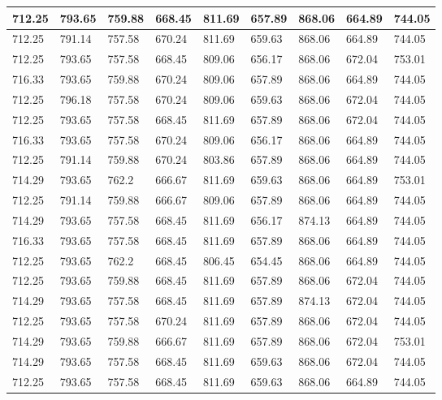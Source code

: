 \begin{longtable}{|l|l|l|l|l|l|l|l|l|}
		712.25   & 793.65  & 759.88  & 668.45  & 811.69 & 657.89  & 868.06   & 664.89  & 744.05  \\ \hline
		712.25   & 791.14  & 757.58  & 670.24  & 811.69 & 659.63  & 868.06   & 664.89  & 744.05  \\ \hline
		712.25   & 793.65  & 757.58  & 668.45  & 809.06 & 656.17  & 868.06   & 672.04  & 753.01  \\ \hline
		716.33   & 793.65  & 759.88  & 670.24  & 809.06 & 657.89  & 868.06   & 664.89  & 744.05  \\ \hline
		712.25   & 796.18  & 757.58  & 670.24  & 809.06 & 659.63  & 868.06   & 672.04  & 744.05  \\ \hline
		712.25   & 793.65  & 757.58  & 668.45  & 811.69 & 657.89  & 868.06   & 672.04  & 744.05  \\ \hline
		716.33   & 793.65  & 757.58  & 670.24  & 809.06 & 656.17  & 868.06   & 664.89  & 744.05  \\ \hline
		712.25   & 791.14  & 759.88  & 670.24  & 803.86 & 657.89  & 868.06   & 664.89  & 744.05  \\ \hline
		714.29   & 793.65  & 762.2   & 666.67  & 811.69 & 659.63  & 868.06   & 664.89  & 753.01  \\ \hline
		712.25   & 791.14  & 759.88  & 666.67  & 809.06 & 657.89  & 868.06   & 664.89  & 744.05  \\ \hline
		714.29   & 793.65  & 757.58  & 668.45  & 811.69 & 656.17  & 874.13   & 664.89  & 744.05  \\ \hline
		716.33   & 793.65  & 757.58  & 668.45  & 811.69 & 657.89  & 868.06   & 664.89  & 744.05  \\ \hline
		712.25   & 793.65  & 762.2   & 668.45  & 806.45 & 654.45  & 868.06   & 664.89  & 744.05  \\ \hline
		712.25   & 793.65  & 759.88  & 668.45  & 811.69 & 657.89  & 868.06   & 672.04  & 744.05  \\ \hline
		714.29   & 793.65  & 757.58  & 668.45  & 811.69 & 657.89  & 874.13   & 672.04  & 744.05  \\ \hline
		712.25   & 793.65  & 757.58  & 670.24  & 811.69 & 657.89  & 868.06   & 672.04  & 744.05  \\ \hline
		714.29   & 793.65  & 759.88  & 666.67  & 811.69 & 657.89  & 868.06   & 672.04  & 753.01  \\ \hline
		714.29   & 793.65  & 757.58  & 668.45  & 811.69 & 659.63  & 868.06   & 672.04  & 744.05  \\ \hline
		712.25   & 793.65  & 757.58  & 668.45  & 811.69 & 659.63  & 868.06   & 664.89  & 744.05  \\ \hline

\end{longtable}
